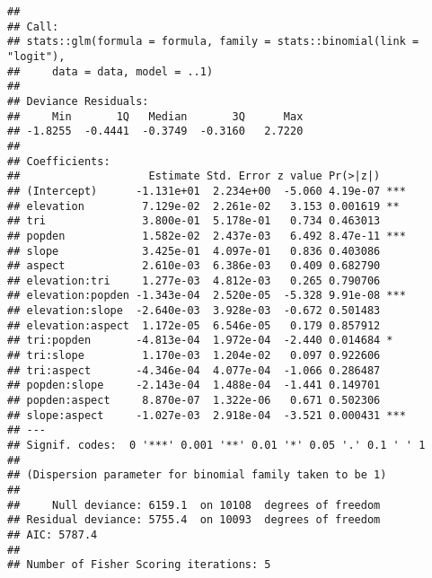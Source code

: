 \documentclass[
]{article}
\newenvironment{Shaded}{\begin{snugshade}}{\end{snugshade}}
\newcommand{\AttributeTok}[1]{\textcolor[rgb]{0.77,0.63,0.00}{#1}}
\newcommand{\DecValTok}[1]{\textcolor[rgb]{0.00,0.00,0.81}{#1}}
\newcommand{\FloatTok}[1]{\textcolor[rgb]{0.00,0.00,0.81}{#1}}
\newcommand{\FunctionTok}[1]{\textcolor[rgb]{0.00,0.00,0.00}{#1}}
\newcommand{\NormalTok}[1]{#1}
\newcommand{\OtherTok}[1]{\textcolor[rgb]{0.56,0.35,0.01}{#1}}
\newcommand{\SpecialCharTok}[1]{\textcolor[rgb]{0.00,0.00,0.00}{#1}}
\newcommand{\StringTok}[1]{\textcolor[rgb]{0.31,0.60,0.02}{#1}}
\begin{document}
\begin{verbatim}
## 
## Call:
## stats::glm(formula = formula, family = stats::binomial(link = "logit"), 
##     data = data, model = ..1)
## 
## Deviance Residuals: 
##     Min       1Q   Median       3Q      Max  
## -1.8255  -0.4441  -0.3749  -0.3160   2.7220  
## 
## Coefficients:
##                    Estimate Std. Error z value Pr(>|z|)    
## (Intercept)      -1.131e+01  2.234e+00  -5.060 4.19e-07 ***
## elevation         7.129e-02  2.261e-02   3.153 0.001619 ** 
## tri               3.800e-01  5.178e-01   0.734 0.463013    
## popden            1.582e-02  2.437e-03   6.492 8.47e-11 ***
## slope             3.425e-01  4.097e-01   0.836 0.403086    
## aspect            2.610e-03  6.386e-03   0.409 0.682790    
## elevation:tri     1.277e-03  4.812e-03   0.265 0.790706    
## elevation:popden -1.343e-04  2.520e-05  -5.328 9.91e-08 ***
## elevation:slope  -2.640e-03  3.928e-03  -0.672 0.501483    
## elevation:aspect  1.172e-05  6.546e-05   0.179 0.857912    
## tri:popden       -4.813e-04  1.972e-04  -2.440 0.014684 *  
## tri:slope         1.170e-03  1.204e-02   0.097 0.922606    
## tri:aspect       -4.346e-04  4.077e-04  -1.066 0.286487    
## popden:slope     -2.143e-04  1.488e-04  -1.441 0.149701    
## popden:aspect     8.870e-07  1.322e-06   0.671 0.502306    
## slope:aspect     -1.027e-03  2.918e-04  -3.521 0.000431 ***
## ---
## Signif. codes:  0 '***' 0.001 '**' 0.01 '*' 0.05 '.' 0.1 ' ' 1
## 
## (Dispersion parameter for binomial family taken to be 1)
## 
##     Null deviance: 6159.1  on 10108  degrees of freedom
## Residual deviance: 5755.4  on 10093  degrees of freedom
## AIC: 5787.4
## 
## Number of Fisher Scoring iterations: 5
\end{verbatim}

\begin{Shaded}
\end{Shaded}
\end{document}
